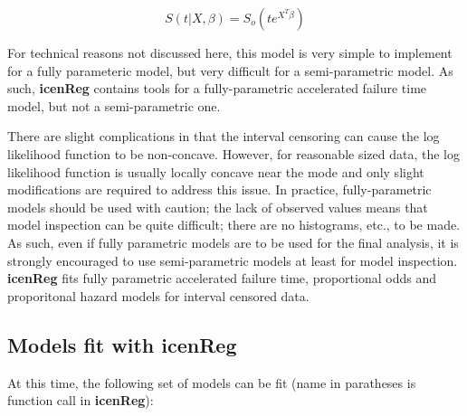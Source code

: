 \documentclass[a4paper]{article}
\begin{document}
\[ S(t | X, \beta) = S_o(t e ^ {X^T \beta}) \]

For technical reasons not discussed here, this model is very simple to implement for a fully parameteric model, but very difficult for a semi-parametric model. As such, {\bf{icenReg}} contains tools for a fully-parametric accelerated failure time model, but not a semi-parametric one. 
  
  
There are slight complications in that the interval censoring can cause the log likelihood function to be non-concave. However, for reasonable sized data, the log likelihood function is usually locally concave near the mode and only slight modifications are required to address this issue. In practice, fully-parametric models should be used with caution; the lack of observed values means that model inspection can be quite difficult; there are no histograms, etc., to be made. As such, even if fully parametric models are to be used for the final analysis, it is strongly encouraged to use semi-parametric models at least for model inspection. {\bf icenReg} fits fully parametric accelerated failure time, proportional odds and  proporitonal hazard models for interval censored data. 
  
\subsection{Models fit with {\bf{icenReg}} }

At this time, the following set of models can be fit (name in paratheses is function call in {\bf{icenReg}}):
  
\end{document}
